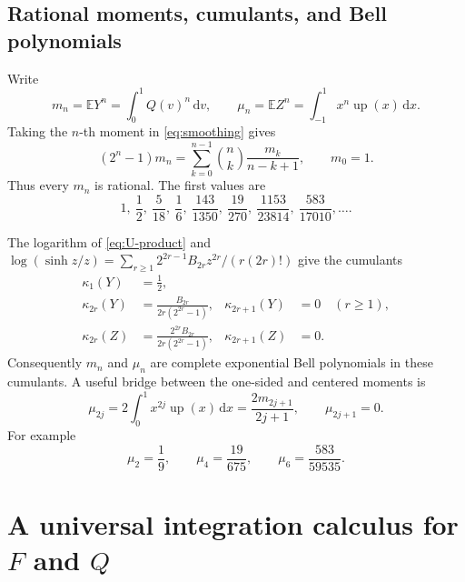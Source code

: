 \documentclass[11pt,oneside]{article}
\theoremstyle{definition}
\newcommand{\F}{F}
\newcommand{\Q}{Q}
\newcommand{\upf}{\operatorname{up}}
\newcommand{\E}{\mathbb E}
\newcommand{\dd}{\,\mathrm d}
\begin{document}
\subsection{Rational moments, cumulants, and Bell polynomials}

Write
\begin{equation}\label{eq:mn-mun}
 m_n=\E Y^n=\int_0^1\Q(v)^n\dd v,
 \qquad
 \mu_n=\E Z^n=\int_{-1}^1x^n\upf(x)\dd x.
\end{equation}
Taking the \(n\)-th moment in \cref{eq:smoothing} gives
\begin{equation}\label{eq:moment-recurrence}
 (2^n-1)m_n
 =\sum_{k=0}^{n-1}\binom nk\frac{m_k}{n-k+1},
 \qquad m_0=1.
\end{equation}
Thus every \(m_n\) is rational.  The first values are
\begin{equation}\label{eq:first-moments}
 1,\ \frac12,\ \frac5{18},\ \frac16,\ \frac{143}{1350},\
 \frac{19}{270},\ \frac{1153}{23814},\ \frac{583}{17010},\ldots.
\end{equation}

The logarithm of \cref{eq:U-product} and
\(
 \log(\sinh z/z)
 =\sum_{r\ge1}2^{2r-1}B_{2r}z^{2r}/(r(2r)!)
\)
give the cumulants
\begin{align}
 \kappa_1(Y)&=\frac12,\nonumber\\
 \kappa_{2r}(Y)&=\frac{B_{2r}}{2r(2^{2r}-1)},
 &\kappa_{2r+1}(Y)&=0\quad(r\ge1),\label{eq:Y-cumulants}\\
 \kappa_{2r}(Z)&=\frac{2^{2r}B_{2r}}{2r(2^{2r}-1)},
 &\kappa_{2r+1}(Z)&=0.\label{eq:Z-cumulants}
\end{align}
Consequently \(m_n\) and \(\mu_n\) are complete exponential Bell polynomials in
these cumulants.  A useful bridge between the one-sided and centered moments is
\begin{equation}\label{eq:mu-m-relation}
 \mu_{2j}
 =2\int_0^1x^{2j}\upf(x)\dd x
 =\frac{2m_{2j+1}}{2j+1},
 \qquad \mu_{2j+1}=0.
\end{equation}
For example
\begin{equation}\label{eq:first-central-moments}
 \mu_2=\frac19,\qquad
 \mu_4=\frac{19}{675},\qquad
 \mu_6=\frac{583}{59535}.
\end{equation}

\section{A universal integration calculus for \texorpdfstring{\(\F\)}{F} and
\texorpdfstring{\(\Q\)}{Q}}
\end{document}
